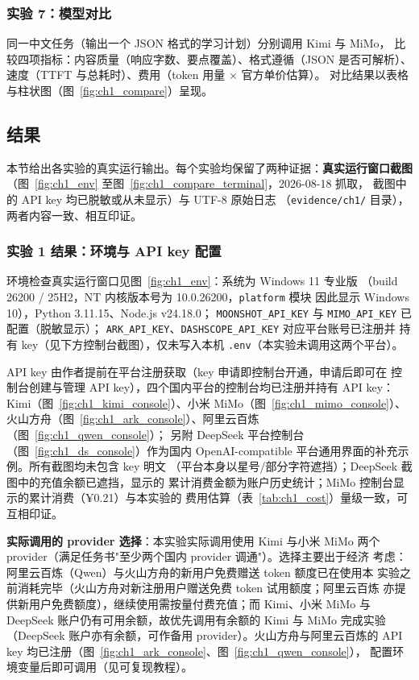 \subsubsection{实验 7：模型对比}

同一中文任务（输出一个 JSON 格式的学习计划）分别调用 Kimi 与 MiMo，
比较四项指标：内容质量（响应字数、要点覆盖）、格式遵循（JSON 是否可解析）、
速度（TTFT 与总耗时）、费用（token 用量 × 官方单价估算）。
对比结果以表格与柱状图（图~\ref{fig:ch1_compare}）呈现。

\subsection{结果}

本节给出各实验的真实运行输出。每个实验均保留了两种证据：\textbf{真实运行窗口截图}
（图~\ref{fig:ch1_env} 至图~\ref{fig:ch1_compare_terminal}，2026-08-18 抓取，
截图中的 API key 均已脱敏或从未显示）与 UTF-8 原始日志
（\texttt{evidence/ch1/} 目录），两者内容一致、相互印证。

\subsubsection{实验 1 结果：环境与 API key 配置}

环境检查真实运行窗口见图~\ref{fig:ch1_env}：系统为 Windows 11 专业版
（build 26200 / 25H2，NT 内核版本号为 10.0.26200，\texttt{platform} 模块
因此显示 Windows 10），Python 3.11.15、Node.js v24.18.0；
\texttt{MOONSHOT\_API\_KEY} 与 \texttt{MIMO\_API\_KEY} 已配置（脱敏显示）；
\texttt{ARK\_API\_KEY}、\texttt{DASHSCOPE\_API\_KEY} 对应平台账号已注册并
持有 key（见下方控制台截图），仅未写入本机 \texttt{.env}（本实验未调用这两个平台）。

API key 由作者提前在平台注册获取（key 申请即控制台开通，申请后即可在
控制台创建与管理 API key），四个国内平台的控制台均已注册并持有 API key：
Kimi（图~\ref{fig:ch1_kimi_console}）、小米 MiMo（图~\ref{fig:ch1_mimo_console}）、
火山方舟（图~\ref{fig:ch1_ark_console}）、阿里云百炼（图~\ref{fig:ch1_qwen_console}）；
另附 DeepSeek 平台控制台（图~\ref{fig:ch1_ds_console}）作为国内
OpenAI-compatible 平台通用界面的补充示例。所有截图均未包含 key 明文
（平台本身以星号/部分字符遮挡）；DeepSeek 截图中的充值余额已遮挡，显示的
累计消费金额为账户历史统计；MiMo 控制台显示的累计消费（¥0.21）与本实验的
费用估算（表~\ref{tab:ch1_cost}）量级一致，可互相印证。

\textbf{实际调用的 provider 选择}：本实验实际调用使用 Kimi 与小米 MiMo
两个 provider（满足任务书"至少两个国内 provider 调通"）。选择主要出于经济
考虑：阿里云百炼（Qwen）与火山方舟的新用户免费赠送 token 额度已在使用本
实验之前消耗完毕（火山方舟对新注册用户赠送免费 token 试用额度；阿里云百炼
亦提供新用户免费额度），继续使用需按量付费充值；而 Kimi、小米 MiMo 与
DeepSeek 账户仍有可用余额，故优先调用有余额的 Kimi 与 MiMo 完成实验
（DeepSeek 账户亦有余额，可作备用 provider）。火山方舟与阿里云百炼的
API key 均已注册（图~\ref{fig:ch1_ark_console}、图~\ref{fig:ch1_qwen_console}），
配置环境变量后即可调用（见可复现教程）。

